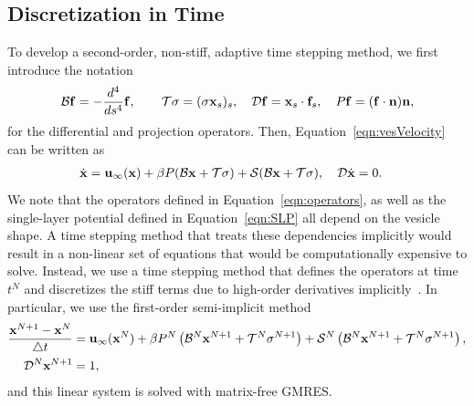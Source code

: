 \documentclass[prb,preprint,showpacs,preprintnumbers,amsmath,amssymb,longbibliography]{revtex4-1}
\begin{document}
\subsection{Discretization in Time}
To develop a second-order, non-stiff, adaptive time stepping method, we
first introduce the notation
\begin{align}
  \mathcal{B}\mathbf{f} = -\frac{d^4}{ds^4} \mathbf{f},  \qquad
  \mathcal{T}\sigma = (\sigma \mathbf{x}_s)_s, \quad
  \mathcal{D}\mathbf{f} = \mathbf{x}_s \cdot \mathbf{f}_s, \quad
  P\mathbf{f} = (\mathbf{f} \cdot \mathbf{n}) \mathbf{n},
  \label{eqn:operators}
\end{align}
for the differential and projection operators. Then,
Equation~\eqref{eqn:vesVelocity} can be written as
\begin{align}
  \dot{\mathbf{x}} &= \mathbf{u}_\infty(\mathbf{x}) + \beta P(\mathcal{B}\mathbf{x} + \mathcal{T}\sigma)
  + \mathcal{S} (\mathcal{B}\mathbf{x} + \mathcal{T}\sigma), \quad \mathcal{D} \dot{\mathbf{x}} = 0.
\end{align}
We note that the operators defined in Equation~\eqref{eqn:operators}, as
well as the single-layer potential defined in Equation~\eqref{eqn:SLP}
all depend on the vesicle shape. A time stepping method that treats
these dependencies implicitly would result in a non-linear set of
equations that would be computationally expensive to solve. Instead, we
use a time stepping method that defines the operators at time $t^N$ and
discretizes the stiff terms due to high-order derivatives
implicitly~\cite{vee-gue-zor-bir2009, qua-bir2014}. In particular, we
use the first-order semi-implicit method
\begin{alignat}{3}  
  \frac{\mathbf{x}^{N+1} - \mathbf{x}^N}{\triangle t} &= \mathbf{u}_\infty(\mathbf{x}^N) 
  + \beta P^N\left(\mathcal{B}^N\mathbf{x}^{N+1} + \mathcal{T}^N\sigma^{N+1}\right) 
  + \mathcal{S}^N\left(\mathcal{B}^N\mathbf{x}^{N+1} + \mathcal{T}^N\sigma^{N+1}\right),  \\
  \mathcal{D}^N\mathbf{x}^{N+1} &= 1,
\end{alignat}
and this linear system is solved with matrix-free GMRES.
\end{document}
